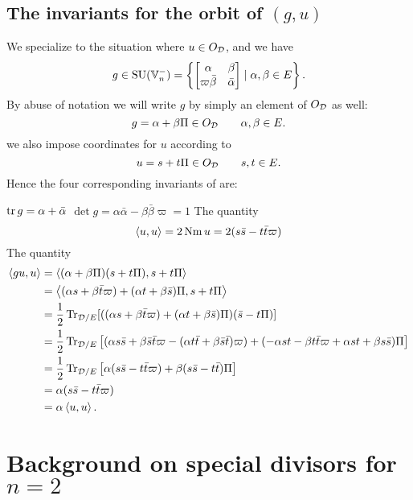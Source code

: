 \subsection{The invariants for the orbit of $(g,u)$}
We specialize to the situation where $u \in O_\mathcal D$, and we have
\[ g \in \operatorname{SU}(\mathbb V_n^-) = \left\{
    \begin{bmatrix} \alpha & \beta \\ \varpi\bar\beta & \bar\alpha \end{bmatrix}
    \mid \alpha, \beta \in E \right\}. \]
By abuse of notation we will write $g$ by simply an element of $O_\mathcal D$ as well:
\[ g = \alpha + \beta \Pi \in O_\mathcal D \qquad \alpha, \beta \in E. \]
we also impose coordinates for $u$ according to
\[ u = s + t \Pi \in O_\mathcal D \qquad s, t \in E. \]
Hence the four corresponding invariants of  are:
\begin{itemize}
  \ii $\operatorname{tr} g = \alpha + \bar\alpha$
  \ii $\det g = \alpha \bar \alpha - \beta \bar\beta \varpi = 1$
  \ii The quantity
  \[ \left\langle u,u \right\rangle = 2 \operatorname{Nm} u = 2(s \bar s - t \bar t \varpi) \]
  \ii The quantity
  \begin{align*}
    \left\langle gu, u \right\rangle
    &= \left\langle (\alpha + \beta \Pi)(s + t \Pi), s + t \Pi \right\rangle \\
    &= \left\langle (\alpha s + \beta \bar t \varpi) + (\alpha t + \beta \bar s) \Pi,
      s + t \Pi \right\rangle \\
    &= \frac{1}{2} \operatorname{Tr}_{\mathcal D/E} [((\alpha s + \beta \bar t \varpi) + (\alpha t + \beta \bar s) \Pi) (\bar s - t \Pi)] \\
    &= \frac{1}{2} \operatorname{Tr}_{\mathcal D/E} \left[
      (\alpha s \bar s + \beta \bar s \bar t \varpi
      - (\alpha t \bar t + \beta \bar s \bar t) \varpi)
      + (-\alpha s t - \beta t \bar t \varpi + \alpha s t + \beta s \bar s) \Pi
    \right] \\
    &= \frac{1}{2} \operatorname{Tr}_{\mathcal D/E} \left[
      \alpha (s \bar s - t \bar t \varpi)
      + \beta(s \bar s - t \bar t) \Pi \right] \\
    &= \alpha (s \bar s - t \bar t \varpi) \\
    &= \alpha \left\langle u,u \right\rangle.
  \end{align*}
\end{itemize}

\section{Background on special divisors for $n = 2$}
